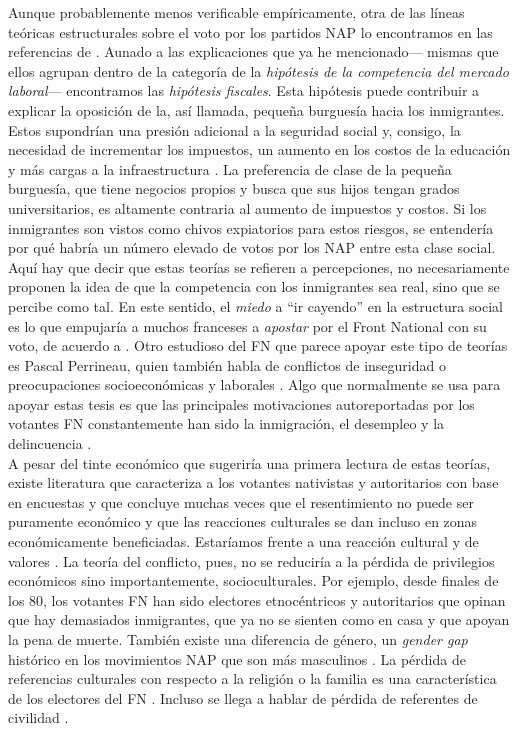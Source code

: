 Aunque probablemente menos verificable empíricamente, otra de las líneas teóricas estructurales sobre el voto por los partidos NAP lo encontramos en las referencias de \textcite{Valentino13}. Aunado a las explicaciones que ya he mencionado--- mismas que ellos agrupan dentro de la categoría de la \textit{hipótesis de la competencia del mercado laboral}--- encontramos las \textit{hipótesis fiscales}. Esta hipótesis puede contribuir a explicar la oposición de la, así llamada, pequeña burguesía hacia los inmigrantes. Estos supondrían una presión adicional a la seguridad social y, consigo, la necesidad de incrementar los impuestos, un aumento en los costos de la educación y más cargas a la infraestructura \parencite{Valentino13}. La preferencia de clase de la pequeña burguesía, que tiene negocios propios y busca que sus hijos tengan grados universitarios, es altamente contraria al aumento de impuestos y costos. Si los inmigrantes son vistos como chivos expiatorios para estos riesgos, se entendería por qué habría un número elevado de votos por los NAP entre esta clase social.\\

Aquí hay que decir que estas teorías se refieren a percepciones, no necesariamente proponen la idea de que la competencia con los inmigrantes sea real, sino que se percibe como tal. En este sentido, el \textit{miedo} a ``ir cayendo'' en la estructura social es lo que empujaría a muchos franceses a \textit{apostar} por el Front National con su voto, de acuerdo a \textcite{LeBras15}. Otro estudioso del FN que parece apoyar este tipo de teorías es Pascal Perrineau, quien también habla de conflictos de inseguridad o preocupaciones socioeconómicas y laborales \parencite{Perrineau07}. Algo que normalmente se usa para apoyar estas tesis es que las principales motivaciones autoreportadas por los votantes FN constantemente han sido la inmigración, el desempleo y la delincuencia \parencite{Mayer07}.\\

A pesar del tinte económico que sugeriría una primera lectura de estas teorías, existe literatura que caracteriza a los votantes nativistas y autoritarios con base en encuestas y que concluye muchas veces que el resentimiento no puede ser puramente económico y que las reacciones culturales se dan incluso en zonas económicamente beneficiadas. Estaríamos frente a una reacción cultural y de valores \parencite{Inglehart16}. La teoría del conflicto, pues, no se reduciría a la pérdida de privilegios económicos sino importantemente, socioculturales. Por ejemplo, desde finales de los 80, los votantes FN han sido electores etnocéntricos y autoritarios que opinan que hay demasiados inmigrantes, que ya no se sienten como en casa y que apoyan la pena de muerte. También existe una diferencia de género, un \textit{gender gap} histórico en los movimientos NAP que son más masculinos \parencites{Crepon15}{Mayer15}{Mudde18}. La pérdida de referencias culturales con respecto a la religión o la familia es una característica de los electores del FN \parencites{MayerPerrineau90}{MayerBoy97}{Perrineau99}{Perrineau12}. Incluso se llega a hablar de pérdida de referentes de civilidad \parencite{Perrineau07}.\\

